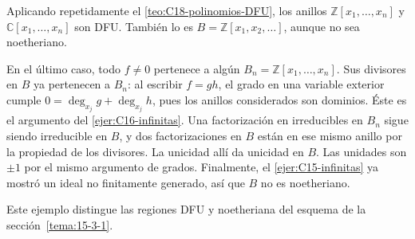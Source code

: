 \begin{ejem}\label{ejem:infinitas-DFU}
Aplicando repetidamente el \cref{teo:C18-polinomios-DFU}, los anillos $\mathbb Z[x_1,\ldots,x_n]$ y $\mathbb C[x_1,\ldots,x_n]$ son DFU. También lo es $B=\mathbb Z[x_1,x_2,\ldots]$, aunque no sea noetheriano.

En el último caso, todo $f\ne0$ pertenece a algún $B_n=\mathbb Z[x_1,\ldots,x_n]$. Sus divisores en $B$ ya pertenecen a $B_n$: al escribir $f=gh$, el grado en una variable exterior cumple $0=\deg_{x_j}g+\deg_{x_j}h$, pues los anillos considerados son dominios. Éste es el argumento del \cref{ejer:C16-infinitas}. Una factorización en irreducibles en $B_n$ sigue siendo irreducible en $B$, y dos factorizaciones en $B$ están en ese mismo anillo por la propiedad de los divisores. La unicidad allí da unicidad en $B$. Las unidades son $\pm1$ por el mismo argumento de grados. Finalmente, el \cref{ejer:C15-infinitas} ya mostró un ideal no finitamente generado, así que $B$ no es noetheriano.
\end{ejem}
Este ejemplo distingue las regiones DFU y noetheriana del esquema de la sección~\ref{tema:15-3-1}.
